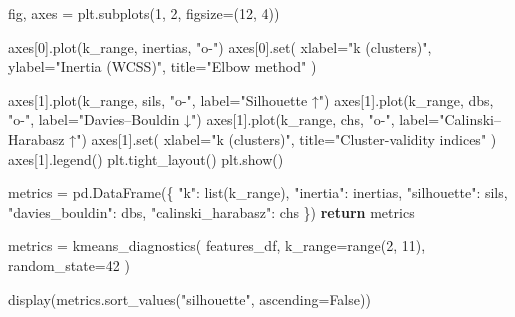 \documentclass[
  letterpaper,
  DIV=11,
  numbers=noendperiod]{scrreprt}
\newenvironment{Shaded}{\begin{snugshade}}{\end{snugshade}}
\newcommand{\BuiltInTok}[1]{\textcolor[rgb]{0.00,0.23,0.31}{#1}}
\newcommand{\ControlFlowTok}[1]{\textcolor[rgb]{0.00,0.23,0.31}{\textbf{#1}}}
\newcommand{\DecValTok}[1]{\textcolor[rgb]{0.68,0.00,0.00}{#1}}
\newcommand{\NormalTok}[1]{\textcolor[rgb]{0.00,0.23,0.31}{#1}}
\newcommand{\OperatorTok}[1]{\textcolor[rgb]{0.37,0.37,0.37}{#1}}
\newcommand{\StringTok}[1]{\textcolor[rgb]{0.13,0.47,0.30}{#1}}
\newcommand{\VariableTok}[1]{\textcolor[rgb]{0.07,0.07,0.07}{#1}}
\begin{document}
\begin{Shaded}
\begin{Highlighting}[]
\NormalTok{    fig, axes }\OperatorTok{=}\NormalTok{ plt.subplots(}\DecValTok{1}\NormalTok{, }\DecValTok{2}\NormalTok{, figsize}\OperatorTok{=}\NormalTok{(}\DecValTok{12}\NormalTok{, }\DecValTok{4}\NormalTok{))}
    
\NormalTok{    axes[}\DecValTok{0}\NormalTok{].plot(k\_range, inertias, }\StringTok{"o{-}"}\NormalTok{)}
\NormalTok{    axes[}\DecValTok{0}\NormalTok{].}\BuiltInTok{set}\NormalTok{(}
\NormalTok{        xlabel}\OperatorTok{=}\StringTok{"k (clusters)"}\NormalTok{,}
\NormalTok{        ylabel}\OperatorTok{=}\StringTok{"Inertia (WCSS)"}\NormalTok{,}
\NormalTok{        title}\OperatorTok{=}\StringTok{"Elbow method"}
\NormalTok{    )}
    
\NormalTok{    axes[}\DecValTok{1}\NormalTok{].plot(k\_range, sils, }\StringTok{"o{-}"}\NormalTok{, label}\OperatorTok{=}\StringTok{"Silhouette ↑"}\NormalTok{)}
\NormalTok{    axes[}\DecValTok{1}\NormalTok{].plot(k\_range, dbs,  }\StringTok{"o{-}"}\NormalTok{, label}\OperatorTok{=}\StringTok{"Davies–Bouldin ↓"}\NormalTok{)}
\NormalTok{    axes[}\DecValTok{1}\NormalTok{].plot(k\_range, chs,  }\StringTok{"o{-}"}\NormalTok{, label}\OperatorTok{=}\StringTok{"Calinski–Harabasz ↑"}\NormalTok{)}
\NormalTok{    axes[}\DecValTok{1}\NormalTok{].}\BuiltInTok{set}\NormalTok{(}
\NormalTok{        xlabel}\OperatorTok{=}\StringTok{"k (clusters)"}\NormalTok{,}
\NormalTok{        title}\OperatorTok{=}\StringTok{"Cluster{-}validity indices"}
\NormalTok{    )}
\NormalTok{    axes[}\DecValTok{1}\NormalTok{].legend()}
\NormalTok{    plt.tight\_layout()}
\NormalTok{    plt.show()}

\NormalTok{    metrics }\OperatorTok{=}\NormalTok{ pd.DataFrame(\{}
        \StringTok{"k"}\NormalTok{: }\BuiltInTok{list}\NormalTok{(k\_range),}
        \StringTok{"inertia"}\NormalTok{: inertias,}
        \StringTok{"silhouette"}\NormalTok{: sils,}
        \StringTok{"davies\_bouldin"}\NormalTok{: dbs,}
        \StringTok{"calinski\_harabasz"}\NormalTok{: chs}
\NormalTok{    \})}
    \ControlFlowTok{return}\NormalTok{ metrics}

\NormalTok{metrics }\OperatorTok{=}\NormalTok{ kmeans\_diagnostics(}
\NormalTok{    features\_df,}
\NormalTok{    k\_range}\OperatorTok{=}\BuiltInTok{range}\NormalTok{(}\DecValTok{2}\NormalTok{, }\DecValTok{11}\NormalTok{), }
\NormalTok{    random\_state}\OperatorTok{=}\DecValTok{42}
\NormalTok{)}

\NormalTok{display(metrics.sort\_values(}\StringTok{"silhouette"}\NormalTok{, ascending}\OperatorTok{=}\VariableTok{False}\NormalTok{))}
\end{Highlighting}
\end{Shaded}
\end{document}
